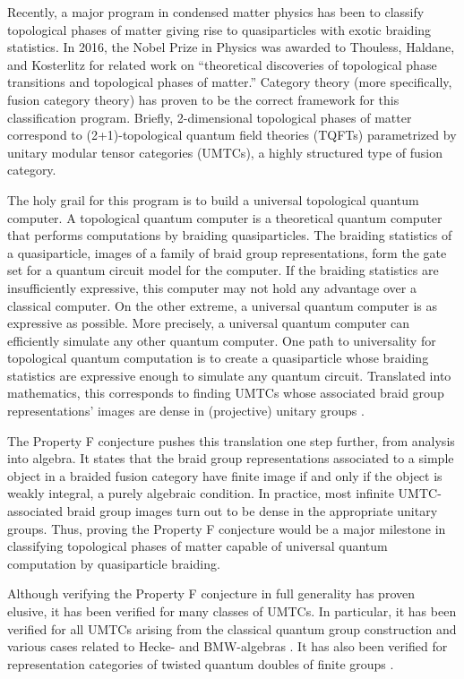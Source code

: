 \documentclass[12pt]{article}
\theoremstyle{plain} \numberwithin{equation}{section}
\theoremstyle{definition}
\begin{document}
Recently, a major program in condensed matter physics has been to classify topological phases of matter giving rise to quasiparticles with exotic braiding statistics. In 2016, the Nobel Prize in Physics was awarded to Thouless, Haldane, and Kosterlitz for related work on ``theoretical discoveries of topological phase transitions and topological phases of matter.'' Category theory (more specifically, fusion category theory) has proven to be the correct framework for this classification program. Briefly, 2-dimensional topological phases of matter correspond to (2+1)-topological quantum field theories (TQFTs) parametrized by unitary modular tensor categories (UMTCs), a highly structured type of fusion category. 

The holy grail for this program is to build a universal topological quantum computer.  A topological quantum computer is a theoretical quantum computer that performs computations by braiding quasiparticles. The braiding statistics of a quasiparticle, images of a family of braid group representations, form the gate set for a quantum circuit model for the computer. If the braiding statistics are insufficiently expressive, this computer may not hold any advantage over a classical computer. On the other extreme, a universal quantum computer is as expressive as possible. More precisely, a universal quantum computer can efficiently simulate any other quantum computer.  One path to universality for topological quantum computation is to create a quasiparticle whose braiding statistics are expressive enough to simulate any quantum circuit.  Translated into mathematics, this corresponds to finding UMTCs whose associated braid group representations' images are dense in (projective) unitary groups \cite{flw}.

The Property F conjecture \cite{nr} pushes this translation one step further, from analysis into algebra.  It states that the braid group representations associated to a simple object in a braided fusion category have finite image if and only if the object is weakly integral, a purely algebraic condition.  In practice, most infinite UMTC-associated braid group images turn out to be dense in the appropriate unitary groups.  Thus, proving the Property F conjecture would be a major milestone in classifying topological phases of matter capable of universal quantum computation by quasiparticle braiding.

Although verifying the Property F conjecture in full generality has proven elusive, it has been verified for many classes of UMTCs.  In particular, it has been verified for all UMTCs arising from the classical quantum group construction and various cases related to Hecke- and BMW-algebras \cite{FRW, flw, jones86, jonescmp, LRW, r, rw}.  It has also been verified for representation categories of twisted quantum doubles of finite groups \cite{erw}.
\end{document}
